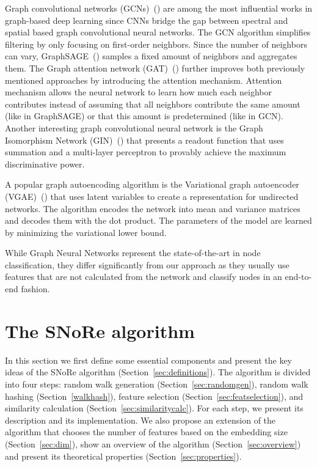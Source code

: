 \documentclass[twoside,11pt]{article}
\begin{document}
Graph convolutional networks (GCNs)~(\cite{kipf2016semi}) are among the most influential works in graph-based deep learning since CNNs bridge the gap between spectral and spatial based graph convolutional neural networks. The GCN algorithm simplifies filtering by only focusing on first-order neighbors. Since the number of neighbors can vary, GraphSAGE~(\cite{hamilton2017graphsage}) samples a fixed amount of neighbors and aggregates them. The Graph attention network (GAT)~(\cite{velickovic2018graph}) further improves both previously mentioned approaches by introducing the attention mechanism. Attention mechanism allows the neural network to learn how much each neighbor contributes instead of assuming that all neighbors contribute the same amount (like in GraphSAGE) or that this amount is predetermined (like in GCN). Another interesting graph convolutional neural network is the Graph Isomorphism Network (GIN)~(\cite{xu2018powerful}) that presents a readout function that uses summation and a multi-layer perceptron to provably achieve the maximum discriminative power.

A popular graph autoencoding algorithm is the Variational graph autoencoder (VGAE)~(\cite{kipf2016variational}) that uses latent variables to create a representation for undirected networks. The algorithm encodes the network into mean and variance matrices and decodes them with the dot product. The parameters of the model are learned by minimizing the variational lower bound.

While Graph Neural Networks represent the state-of-the-art in node classification, they differ significantly from our approach as they usually use features that are not calculated from the network and classify nodes in an end-to-end fashion.

\section{The SN{o}R{e} algorithm}
In this section we first define some essential components and present the key ideas of the SNoRe algorithm (Section~\ref{sec:definitions}). The algorithm is divided into four steps: random walk generation (Section~\ref{sec:randomgen}), random walk hashing (Section~\ref{walkhash}), feature selection (Section~\ref{sec:featselection}), and similarity calculation (Section~\ref{sec:similaritycalc}). For each step, we present its description and its implementation. We also propose an extension of the algorithm that chooses the number of features based on the embedding size (Section~\ref{sec:dim}), show an overview of the algorithm (Section~\ref{sec:overview}) and present its theoretical properties (Section~\ref{sec:properties}).
\end{document}
